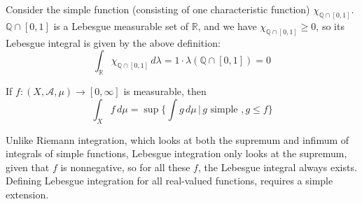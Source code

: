   \begin{example}
    Consider the simple function (consisting of one characteristic function) $\chi_{\mathbb{Q} \cap [0, 1]}$. $\mathbb{Q} \cap [0, 1]$ is a Lebesgue measurable set of $\mathbb{R}$, and we have $\chi_{\mathbb{Q} \cap [0, 1]} \geq 0$, so its Lebesgue integral is given by the above definition: 
    \begin{equation}
      \int_{\mathbb{R}} \chi_{\mathbb{Q} \cap [0, 1]} \, d\lambda = 1 \cdot \lambda(\mathbb{Q} \cap [0, 1]) = 0
    \end{equation}
  \end{example}

  \begin{definition}
    If $f: (X, \mathcal{A}, \mu) \longrightarrow [0, \infty]$ is measurable, then 
    \begin{equation}
      \int_X f \, d\mu = \sup \Big\{ \int g\, d\mu \,\Big|\, g \text{ simple }, g \leq f\Big\}
    \end{equation}
  \end{definition}

  Unlike Riemann integration, which looks at both the supremum and infimum of integrals of simple functions, Lebesgue integration only looks at the supremum, given that $f$ is nonnegative, so for all these $f$, the Lebesgue integral always exists. Defining Lebesgue integration for all real-valued functions, requires a simple extension. 

